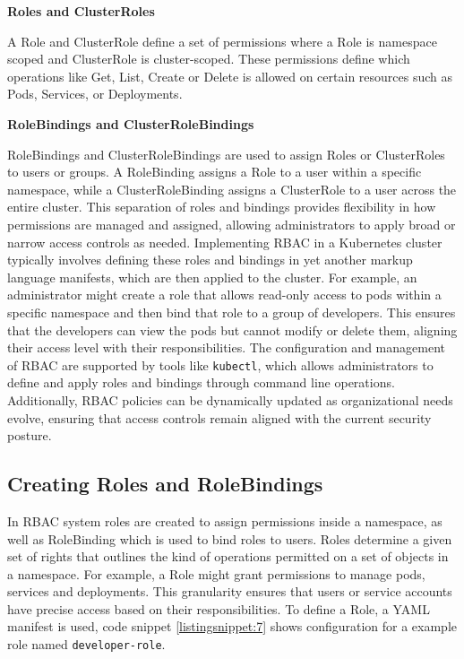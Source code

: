 \textbf{Roles and ClusterRoles} 

A Role and ClusterRole define a set of permissions where a Role is namespace scoped and ClusterRole is cluster-scoped. These permissions define which operations like Get, List, Create or Delete is allowed on certain resources such as Pods, Services, or Deployments. \cite{Kubernetes_doc}

\textbf{RoleBindings and ClusterRoleBindings} 

RoleBindings and ClusterRoleBindings are used to assign Roles or ClusterRoles to users or groups. A RoleBinding assigns a Role to a user within a specific namespace, while a ClusterRoleBinding assigns a ClusterRole to a user across the entire cluster. This separation of roles and bindings provides flexibility in how permissions are managed and assigned, allowing administrators to apply broad or narrow access controls as needed. Implementing RBAC in a Kubernetes cluster typically involves defining these roles and bindings in yet another markup language  manifests, which are then applied to the cluster. For example, an administrator might create a role that allows read-only access to pods within a specific namespace and then bind that role to a group of developers. This ensures that the developers can view the pods but cannot modify or delete them, aligning their access level with their responsibilities. The configuration and management of RBAC are supported by tools like \texttt{kubectl}, which allows administrators to define and apply roles and bindings through command line operations. Additionally, RBAC policies can be dynamically updated as organizational needs evolve, ensuring that access controls remain aligned with the current security posture. \cite{Kubernetes_doc}

\subsection{Creating Roles and RoleBindings}

In RBAC system roles are created to assign permissions inside a namespace, as well as RoleBinding which is used to bind roles to users. Roles determine a given set of rights that outlines the kind of operations permitted on a set of objects in a namespace. For example, a Role might grant permissions to manage pods, services and deployments. This granularity ensures that users or service accounts have precise access based on their responsibilities. To define a Role, a YAML manifest is used, code snippet \autoref{listingsnippet:7} shows configuration for a example role named \texttt{developer-role}. \cite{Kubernetes_doc}

